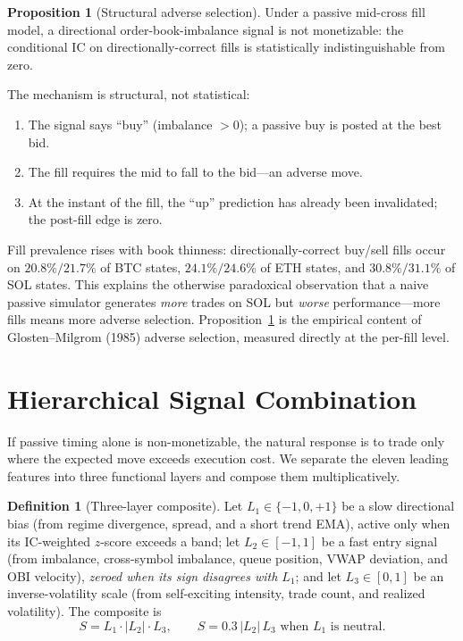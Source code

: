 \documentclass[11pt,a4paper]{article}
\theoremstyle{definition}
\newtheorem{definition}{Definition}[section]
\newtheorem{proposition}{Proposition}[section]
\theoremstyle{plain}
\begin{document}
\begin{proposition}[Structural adverse selection]
\label{prop:adverse}
Under a passive mid-cross fill model, a directional order-book-imbalance signal is not monetizable:
the conditional IC on directionally-correct fills is statistically indistinguishable from zero.
\end{proposition}

\noindent The mechanism is structural, not statistical:
\begin{enumerate}
  \item The signal says ``buy'' (imbalance $>0$); a passive buy is posted at the best bid.
  \item The fill requires the mid to fall to the bid---an adverse move.
  \item At the instant of the fill, the ``up'' prediction has already been invalidated; the
        post-fill edge is zero.
\end{enumerate}
Fill prevalence rises with book thinness: directionally-correct buy/sell fills occur on
$20.8\%/21.7\%$ of BTC states, $24.1\%/24.6\%$ of ETH states, and $30.8\%/31.1\%$ of SOL states.
This explains the otherwise paradoxical observation that a naive passive simulator generates
\emph{more} trades on SOL but \emph{worse} performance---more fills means more adverse selection.
Proposition~\ref{prop:adverse} is the empirical content of Glosten--Milgrom (1985) adverse
selection, measured directly at the per-fill level.

\section{Hierarchical Signal Combination}
\label{sec:combiner}

If passive timing alone is non-monetizable, the natural response is to trade only where the
expected move exceeds execution cost. We separate the eleven leading features into three
functional layers and compose them multiplicatively.

\begin{definition}[Three-layer composite]
\label{def:combiner}
Let $L_1\in\{-1,0,+1\}$ be a slow directional bias (from regime divergence, spread, and a
short trend EMA), active only when its IC-weighted $z$-score exceeds a band; let $L_2\in[-1,1]$ be
a fast entry signal (from imbalance, cross-symbol imbalance, queue position, VWAP deviation, and
OBI velocity), \emph{zeroed when its sign disagrees with $L_1$}; and let $L_3\in[0,1]$ be an
inverse-volatility scale (from self-exciting intensity, trade count, and realized volatility). The
composite is
\begin{equation}
  S = L_1 \cdot |L_2| \cdot L_3,
  \qquad
  S = 0.3\,|L_2|\,L_3 \text{ when } L_1 \text{ is neutral.}
  \label{eq:composite}
\end{equation}
\end{definition}
\end{document}
